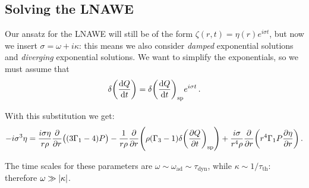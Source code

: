 \documentclass[main.tex]{subfiles}
\begin{document}
\subsection{Solving the LNAWE}

Our ansatz for the LNAWE will still be of the form \(\zeta (r, t) = \eta (r) e^{i \sigma t}\), but now we insert \(\sigma = \omega + i \kappa \): this means we also consider \emph{damped} exponential solutions and \emph{diverging} exponential solutions. 
We want to simplify the exponentials, so we must assume that 
%
\begin{align}
\delta \qty(\dv{Q}{t}) = \delta \qty(\dv{Q}{t}) _{\text{sp}} e^{i \sigma t}
\,.
\end{align}


With this substitution we get: 
%
\begin{align}
- i \sigma^3 \eta = \frac{i \sigma \eta }{r \rho }
\pdv{}{r} \qty((3 \Gamma_1 -4)P) - \frac{1}{r \rho }
\pdv{}{r} \qty(\rho (\Gamma_3 -1) \delta \qty(\pdv{Q}{t})_{\text{sp}}) 
+ \frac{i \sigma}{r^{4} \rho } \pdv{}{r} \qty(r^{4} \Gamma_1 P \pdv{\eta }{r})
\,.
\end{align}



The time scales for these parameters are \(\omega \sim \omega _{\text{ad}} \sim \tau _{\text{dyn}}\), while \(\kappa \sim 1/ \tau _{\text{th}}\): therefore \(\omega \gg \abs{\kappa } \).
\end{document}
